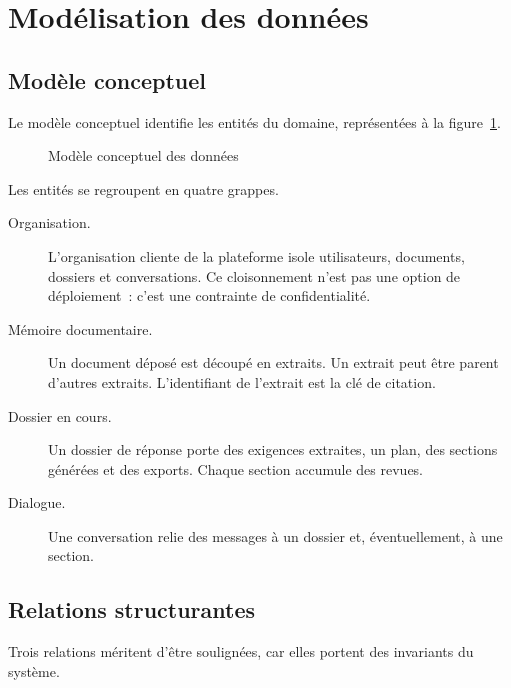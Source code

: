 \section{Modélisation des données}
\label{sec:ch2-donnees}

\subsection{Modèle conceptuel}

Le modèle conceptuel identifie les entités du domaine, représentées à la
figure~\ref{fig:modele-conceptuel}.

\begin{figure}[htbp]
  \centering
  \resizebox{\linewidth}{!}{}
  \caption{Modèle conceptuel des données}
  \label{fig:modele-conceptuel}
\end{figure}

Les entités se regroupent en quatre grappes.

\begin{description}
  \item[Organisation.] L'organisation cliente de la plateforme isole
        utilisateurs, documents, dossiers et conversations. Ce
        cloisonnement n'est pas une option de déploiement~: c'est une
        contrainte de confidentialité.
  \item[Mémoire documentaire.] Un document déposé est découpé en extraits.
        Un extrait peut être parent d'autres extraits. L'identifiant de
        l'extrait est la clé de citation.
  \item[Dossier en cours.] Un dossier de réponse porte des exigences
        extraites, un plan, des sections générées et des exports. Chaque
        section accumule des revues.
  \item[Dialogue.] Une conversation relie des messages à un dossier et,
        éventuellement, à une section.
\end{description}

\subsection{Relations structurantes}

Trois relations méritent d'être soulignées, car elles portent des
invariants du système.

